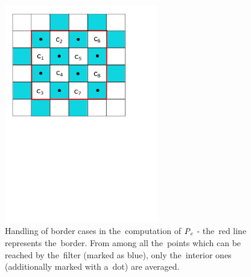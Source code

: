\begin{figure}
	\includegraphics[trim={1cm 14cm 2cm 0}, clip, width=0.6\textwidth]{figures/cborders.pdf}\centering
	\caption{Handling of border cases in the~computation of $\mathit{P_{c}}$ - the~red line represents the~border. From among all the~points which can be reached by the~filter (marked as blue), only the~interior ones (additionally marked with a~dot) are averaged.}
	\label{fig:cborders}
\end{figure}

